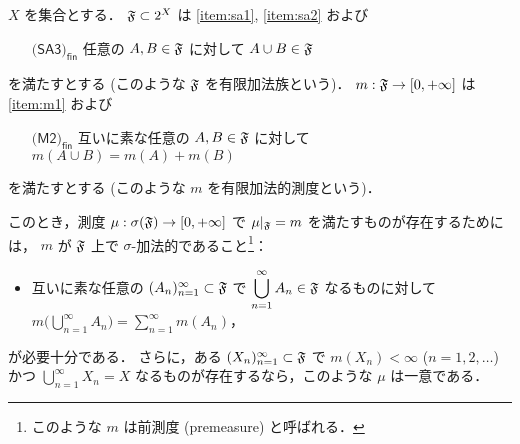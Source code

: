 \begin{theorem}\label{thm:Hopf_extension}
    \leavevmode\par
    $X$ を集合とする．
    $\mathfrak{F}\subset2^X$ は \ref{item:sa1}, \ref{item:sa2} および
    \begin{enumerate}[align=left]
        \item[$\textsf{(SA3)}_\textsf{fin}$] 任意の $A,B\in\mathfrak{F}$ に対して $A\cup B\in\mathfrak{F}$
    \end{enumerate}
    を満たすとする (このような $\mathfrak{F}$ を有限加法族という)．
    $m:\mathfrak{F}\to[0,+\infty]$ は \ref{item:m1} および
    \begin{enumerate}[align=left]
        \item[$\textsf{(M2)}_\textsf{fin}$] 互いに素な任意の $A,B\in\mathfrak{F}$ に対して $m(A\cup B)=m(A)+m(B)$
    \end{enumerate}
    を満たすとする (このような $m$ を有限加法的測度という)．

    このとき，測度 $\mu:\sigma(\mathfrak{F})\to[0,+\infty]$ で $\mu\vert_{\mathfrak{F}}=m$ を満たすものが存在するためには，
    $m$ が $\mathfrak{F}$ 上で $\sigma$-加法的であること\footnote{このような $m$ は前測度 (premeasure) と呼ばれる．}：
    \begin{itemize}
        \item 互いに素な任意の $(A_n)_{n=1}^\infty\subset\mathfrak{F}$ で
            $\displaystyle\bigcup_{n=1}^\infty A_n\in\mathfrak{F}$ なるものに対して
            $\displaystyle m\biggl(\bigcup_{n=1}^\infty A_n\biggr)=\sum_{n=1}^\infty m(A_n)$，
    \end{itemize}
    が必要十分である．
    さらに，ある $(X_n)_{n=1}^\infty\subset\mathfrak{F}$ で
    $m(X_n)<\infty$ ($n=1,2,\ldots$) かつ $\displaystyle\bigcup_{n=1}^\infty X_n=X$
    なるものが存在するなら，このような $\mu$ は一意である．
\end{theorem}


